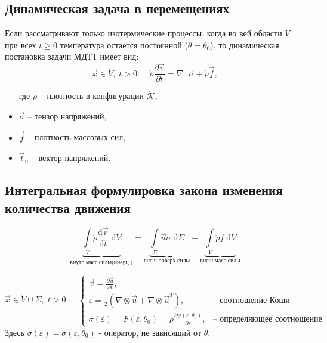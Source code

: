 
\subsection{Динамическая задача в перемещениях}

Если рассматривают только изотермические процессы, когда во вей области $V$ при всех $t\geqslant0$ температура остается постоянной ($\theta=\theta_0$), то динамическая постановка задачи МДТТ имеет вид:
\[
	\vec{x}\in\mathring{V},\;t>0:\quad \mathring{\rho} \frac{\partial \vec{v}}{\partial t} = \nabla \cdot \vec{\sigma} + \mathring{\rho}\vec{f},
\]
\begin{itemize}[label*=]
	\item[где] $\mathring{\rho}$ -- плотность в конфигурации $\mathring{\mathcal{K}}$,
	\item $\vec{\sigma}$ -- тензор напряжений,
	\item $\vec{f}$ -- плотность массовых сил,
	\item $\vec{t}_n$ -- вектор напряжений.
\end{itemize}

\subsection{Интегральная формулировка закона изменения количества движения}
\[
	\underbrace{\int\limits_{V} \mathring{\rho} \frac{\mathrm{d}\vec{v}}{\mathrm{d}t}\;\mathrm{d}V}_{\text{внутр.масс.силы(инерц.)}} =
	\underbrace{\int\limits_{\Sigma} \vec{n}\sigma\;\mathrm{d}\Sigma}_{\text{внеш.поверх.силы}} +
	\underbrace{\int\limits_{V}\mathring{\rho} f \;\mathrm{d}V}_{\text{внеш.масс.силы}}
\]

\[
\vec{x}\in\mathring{V}\cup\Sigma,\;t>0:\quad\begin{cases}
	\vec{v}=\frac{\partial\vec{u}}{\partial t}, &\\
	\varepsilon=\frac{1}{2}(\nabla\otimes\vec{u}+\nabla\otimes\vec{u}^T),&\text{-- соотношение Коши}\\
	\sigma(\varepsilon) = F(\varepsilon,\theta_0)=\rho\frac{\partial\psi(\varepsilon,\theta_0)}{\partial\varepsilon},&\text{-- определяющее соотношение}
\end{cases}
\]
Здесь $\sigma(\varepsilon)=\sigma(\varepsilon,\theta_0)$ - оператор, не зависящий от $\theta$.

